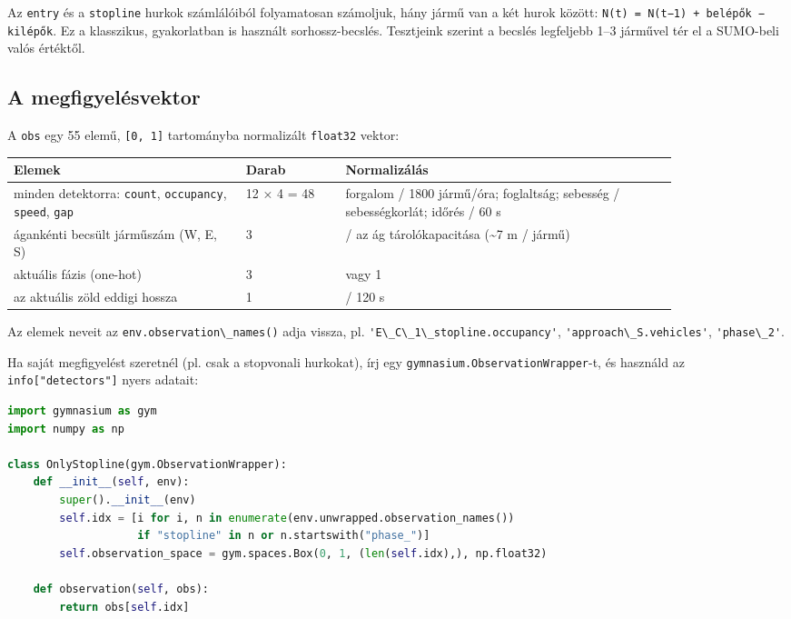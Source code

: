 Az \passthrough{\lstinline!entry!} és a
\passthrough{\lstinline!stopline!}
hurkok számlálóiból folyamatosan
számoljuk, hány jármű van a két hurok
között:
\passthrough{\lstinline!N(t) = N(t−1) + belépők − kilépők!}.
Ez a klasszikus, gyakorlatban is
használt sorhossz-becslés. Tesztjeink
szerint a becslés legfeljebb 1--3
járművel tér el a SUMO-beli valós
értéktől.

\hypertarget{a-megfigyeluxe9svektor}{%
\subsection{A
megfigyelésvektor}\label{a-megfigyeluxe9svektor}}

A \passthrough{\lstinline!obs!} egy 55
elemű, \passthrough{\lstinline![0, 1]!}
tartományba normalizált
\passthrough{\lstinline!float32!}
vektor:

\begin{longtable}[]{@{}>{\raggedright\arraybackslash}p{0.35\linewidth}l>{\raggedright\arraybackslash}p{0.50\linewidth}@{}}
\toprule\noalign{}
Elemek & Darab & Normalizálás \\
\midrule\noalign{}
\endhead
\bottomrule\noalign{}
\endlastfoot
minden detektorra:
\passthrough{\lstinline!count!},
\passthrough{\lstinline!occupancy!},
\passthrough{\lstinline!speed!},
\passthrough{\lstinline!gap!} & 12 × 4 =
48 & forgalom / 1800 jármű/óra;
foglaltság; sebesség / sebességkorlát;
időrés / 60 s \\
ágankénti becsült járműszám (W, E, S) &
3 & / az ág tárolókapacitása
(\textasciitilde7 m / jármű) \\
aktuális fázis (one-hot) & 3 & 0 vagy
1 \\
az aktuális zöld eddigi hossza & 1 & /
120 s \\
\end{longtable}

Az elemek neveit az
\passthrough{\lstinline!env.observation\_names()!}
adja vissza, pl.
\passthrough{\lstinline!'E\_C\_1\_stopline.occupancy'!},
\passthrough{\lstinline!'approach\_S.vehicles'!},
\passthrough{\lstinline!'phase\_2'!}.

Ha saját megfigyelést szeretnél (pl.
csak a stopvonali hurkokat), írj egy
\passthrough{\lstinline!gymnasium.ObservationWrapper!}-t,
és használd az
\passthrough{\lstinline!info["detectors"]!}
nyers adatait:

\begin{lstlisting}[language=Python]
import gymnasium as gym
import numpy as np

class OnlyStopline(gym.ObservationWrapper):
    def __init__(self, env):
        super().__init__(env)
        self.idx = [i for i, n in enumerate(env.unwrapped.observation_names())
                    if "stopline" in n or n.startswith("phase_")]
        self.observation_space = gym.spaces.Box(0, 1, (len(self.idx),), np.float32)

    def observation(self, obs):
        return obs[self.idx]
\end{lstlisting}


